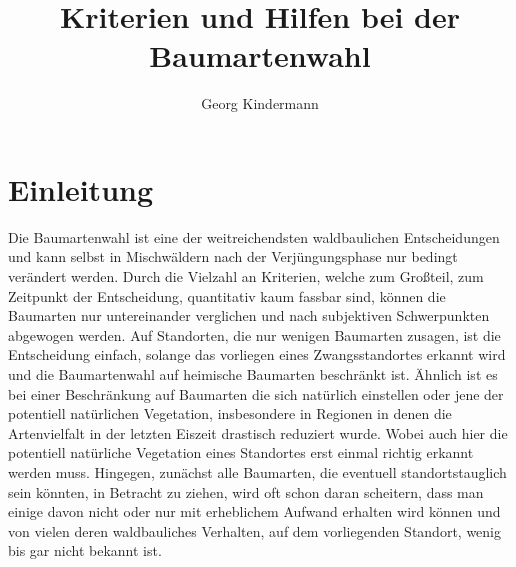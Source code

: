 \documentclass[twocolumn]{scrartcl}
\title{Kriterien und Hilfen bei der Baumartenwahl}
\author{Georg Kindermann}
\begin{document}
\twocolumn[
  \begin{@twocolumnfalse}
    \maketitle
    \begin{abstract}

    \end{abstract}
  \end{@twocolumnfalse}
]

\tableofcontents

\section{Einleitung}

Die Baumartenwahl ist eine der weitreichendsten waldbaulichen
Entscheidungen und kann selbst in Mischwäldern nach der
Verjüngungsphase nur bedingt verändert werden. Durch die Vielzahl an
Kriterien, welche zum Großteil, zum Zeitpunkt der Entscheidung,
quantitativ kaum fassbar sind, können die Baumarten nur untereinander
verglichen und nach subjektiven Schwerpunkten abgewogen werden. Auf
Standorten, die nur wenigen Baumarten zusagen, ist die Entscheidung
einfach, solange das vorliegen eines Zwangsstandortes erkannt wird und
die Baumartenwahl auf heimische Baumarten beschränkt ist. Ähnlich ist
es bei einer Beschränkung auf Baumarten die sich natürlich einstellen
oder jene der potentiell natürlichen Vegetation, insbesondere in
Regionen in denen die Artenvielfalt in der letzten Eiszeit drastisch
reduziert wurde. Wobei auch hier die potentiell natürliche Vegetation
eines Standortes erst einmal richtig erkannt werden muss. Hingegen,
zunächst alle Baumarten, die eventuell standortstauglich sein könnten,
in Betracht zu ziehen, wird oft schon daran scheitern, dass man einige
davon nicht oder nur mit erheblichem Aufwand erhalten wird können und
von vielen deren waldbauliches Verhalten, auf dem vorliegenden
Standort, wenig bis gar nicht bekannt ist.
\end{document}
